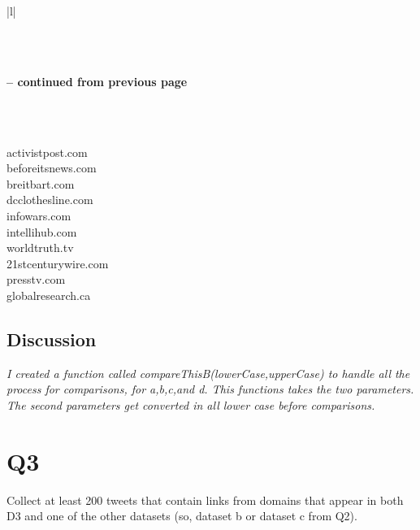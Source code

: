 \documentclass[12pt]{article}
\begin{document}
\begin{center}
\begin{longtable}{|l|}
\caption{domains that are present in all three datasets (gotten from finalD.csv)} \label{tab6:long} \\

\hline {}  \\ \hline 
\endfirsthead

%
{{\bfseries \tablename \thetable{} -- continued from previous page}} \\
\hline  {}  \\ \hline 
\endhead

\hline {} \\ \hline
\endfoot

\hline \hline
\endlastfoot
activistpost.com    \\
beforeitsnews.com   \\
breitbart.com       \\
dcclothesline.com   \\
infowars.com        \\
intellihub.com      \\
worldtruth.tv       \\
21stcenturywire.com \\
presstv.com         \\
globalresearch.ca  
\end{longtable}


\end{center}
\subsection*{Discussion}
\emph{I created a function called compareThisB(lowerCase,upperCase) to handle all the process for comparisons, for a,b,c,and d. This functions takes the two parameters. The second parameters get converted in all lower case before comparisons. }


\section*{Q3}
Collect at least 200 tweets that contain links from domains that appear in both D3 and one of the other datasets (so, dataset b or dataset c from Q2).
\end{document}
